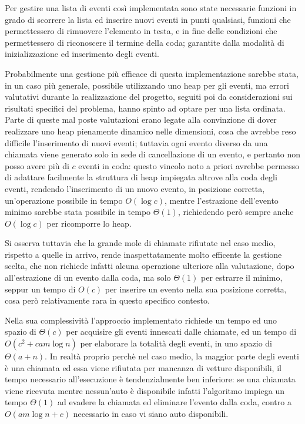 \documentclass[a4paper,11pt]{Article}
\begin{document}
Per gestire una lista di eventi così implementata sono state necessarie funzioni in grado di scorrere la lista ed inserire nuovi eventi in punti qualsiasi, funzioni che permettessero di rimuovere l'elemento in testa, e in fine delle condizioni che permettessero di riconoscere il termine della coda; garantite dalla modalità di inizializzazione ed inserimento degli eventi.

Probabilmente una gestione più efficace di questa implementazione sarebbe stata, in un caso più generale, possibile utilizzando uno heap per gli eventi, ma errori valutativi durante la realizzazione del progetto, seguiti poi da considerazioni sui risultati specifici del problema, hanno spinto ad optare per una lista ordinata. Parte di queste mal poste valutazioni erano legate alla convinzione di dover realizzare uno heap pienamente dinamico nelle dimensioni, cosa che avrebbe reso difficile l'inserimento di nuovi eventi; tuttavia ogni evento diverso da una chiamata viene generato solo in sede di cancellazione di un evento, e pertanto non posso avere più di $c$ eventi in coda: questo vincolo noto a priori avrebbe permesso di adattare facilmente la struttura di heap impiegata altrove alla coda degli eventi, rendendo l'inserimento di un nuovo evento, in posizione corretta, un'operazione possibile in tempo $O(\log{c})$, mentre l'estrazione dell'evento minimo sarebbe stata possibile in tempo $\Theta(1)$, richiedendo però sempre anche $O(\log{c})$ per ricomporre lo heap.

Si osserva tuttavia che la grande mole di chiamate rifiutate nel caso medio, rispetto a quelle in arrivo, rende inaspettatamente molto efficente la gestione scelta, che non richiede infatti alcuna operazione ulteriore alla valutazione, dopo all'estrazione di un evento dalla coda, ma solo $\Theta(1)$ per estrarre il minimo, seppur un tempo di $O(c)$ per inserire un evento nella sua posizione corretta, cosa però relativamente rara in questo specifico contesto.

Nella sua complessività l'approccio implementato richiede un tempo ed uno spazio di $\Theta(c)$ per acquisire gli eventi innescati dalle chiamate, ed un tempo di  $O(c^2 + cam\log{n})$ per elaborare la totalità degli eventi, in uno spazio di  $\Theta(a + n)$.
In realtà proprio perchè nel caso medio, la maggior parte degli eventi è una chiamata ed essa viene rifiutata per mancanza di vetture disponibili, il tempo necessario all'esecuzione è tendenzialmente ben inferiore: se una chiamata viene ricevuta mentre nessun'auto è disponibile infatti l'algoritmo impiega un tempo $\Theta(1)$ ad evadere la chiamata ed eliminare l'evento dalla coda, contro a $O(am\log{n} + c)$ necessario in caso vi siano auto disponibili.
\end{document}
